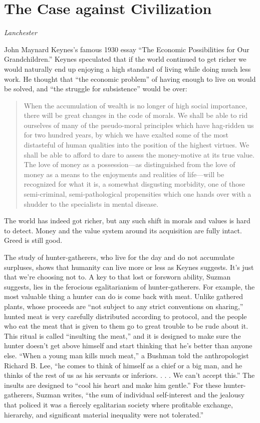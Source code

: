 \documentclass[
]{book}
\begin{document}
\hypertarget{the-case-against-civilization}{%
\section{The Case against Civilization}\label{the-case-against-civilization}}

\emph{Lanchester}

John Maynard Keynes's famous 1930 essay ``The Economic Possibilities for Our Grandchildren.'' Keynes speculated that if the world continued to get richer we would naturally end up enjoying a high standard of living while doing much less work. He thought that ``the economic problem'' of having enough to live on would be solved, and ``the struggle for subsistence'' would be over:

\begin{quote}
When the accumulation of wealth is no longer of high social importance, there will be great changes in the code of morals. We shall be able to rid ourselves of many of the pseudo-moral principles which have hag-ridden us for two hundred years, by which we have exalted some of the most distasteful of human qualities into the position of the highest virtues. We shall be able to afford to dare to assess the money-motive at its true value. The love of money as a possession---as distinguished from the love of money as a means to the enjoyments and realities of life---will be recognized for what it is, a somewhat disgusting morbidity, one of those semi-criminal, semi-pathological propensities which one hands over with a shudder to the specialists in mental disease.
\end{quote}

The world has indeed got richer, but any such shift in morals and values is hard to detect. Money and the value system around its acquisition are fully intact. Greed is still good.

The study of hunter-gatherers, who live for the day and do not accumulate surpluses, shows that humanity can live more or less as Keynes suggests. It's just that we're choosing not to. A key to that lost or forsworn ability, Suzman suggests, lies in the ferocious egalitarianism of hunter-gatherers. For example, the most valuable thing a hunter can do is come back with meat. Unlike gathered plants, whose proceeds are ``not subject to any strict conventions on sharing,'' hunted meat is very carefully distributed according to protocol, and the people who eat the meat that is given to them go to great trouble to be rude about it. This ritual is called ``insulting the meat,'' and it is designed to make sure the hunter doesn't get above himself and start thinking that he's better than anyone else. ``When a young man kills much meat,'' a Bushman told the anthropologist Richard B. Lee, ``he comes to think of himself as a chief or a big man, and he thinks of the rest of us as his servants or inferiors. . . . We can't accept this.'' The insults are designed to ``cool his heart and make him gentle.'' For these hunter-gatherers, Suzman writes, ``the sum of individual self-interest and the jealousy that policed it was a fiercely egalitarian society where profitable exchange, hierarchy, and significant material inequality were not tolerated.''
\end{document}
